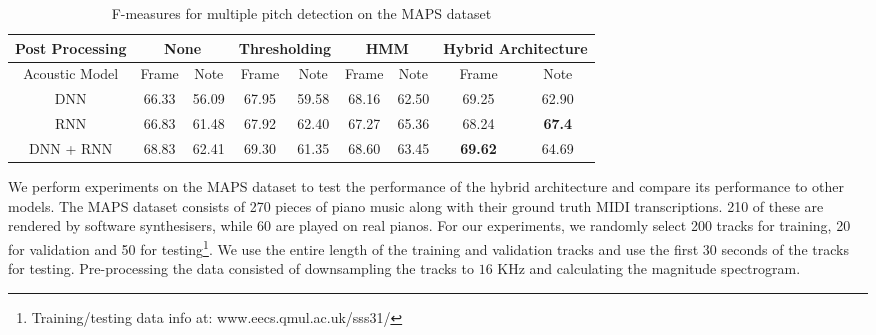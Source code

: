 \documentclass{article}
\begin{document}
\begin{table*}[htpb]
\begin{center}
  \begin{tabular}{|c| c  c | c  c | c  c | c c|}
    \hline
    Post Processing& \multicolumn{2}{|c|}{None}&\multicolumn{2}{c|}{Thresholding}&\multicolumn{2}{c|}{HMM}&\multicolumn{2}{c|}{Hybrid Architecture}\\ \hline
    Acoustic Model& Frame & Note & Frame & Note & Frame & Note & Frame & Note \\ \hline
    DNN & 66.33 & 56.09 & 67.95 &59.58 &68.16 & 62.50 & 69.25 & 62.90 \\ \hline
    RNN & 66.83 & 61.48 & 67.92 & 62.40 & 67.27 & 65.36 &68.24 & \textbf{67.4} \\ \hline
    DNN + RNN & 68.83 &62.41 &69.30 &61.35 & 68.60 & 63.45 & \textbf{69.62} &64.69 \\ \hline
  \end{tabular}%
\end{center}
\vspace{-1.8em}\caption{F-measures for multiple pitch detection on the MAPS dataset}
\end{table*}
We perform experiments on the MAPS dataset \cite{emiya2010multipitch} to test the performance of the hybrid architecture and compare its performance to other models. The MAPS dataset consists of 270 pieces of piano music along with their ground truth MIDI transcriptions. 210 of these are rendered by software synthesisers, while 60 are played on real pianos. For our experiments, we randomly select 200 tracks for training, 20 for validation and 50 for testing\footnote{Training/testing data info at: www.eecs.qmul.ac.uk/\texttildelow sss31/}. We use the entire length of the training and validation tracks and use the first 30 seconds of the tracks for testing. Pre-processing the data consisted of downsampling the tracks to $16$ KHz and calculating the magnitude spectrogram. 
\end{document}
